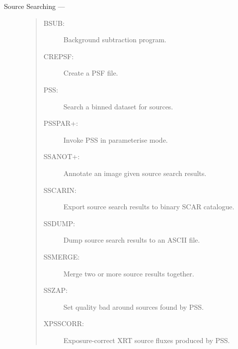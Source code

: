 \begin{description}
\item [Source Searching ---]
\begin{quote}
\begin{description}
\item [BSUB:]      Background subtraction program.
\item [CREPSF:]    Create a PSF file.
\item [PSS:]       Search a binned dataset for sources.
\item [PSSPAR+:]   Invoke PSS in parameterise mode.
\item [SSANOT+:]   Annotate an image given source search results.
\item [SSCARIN:]   Export source search results to binary SCAR catalogue.
\item [SSDUMP:]    Dump source search results to an ASCII file.
\item [SSMERGE:]   Merge two or more source results together.
\item [SSZAP:]     Set quality bad around sources found by PSS.
\item [XPSSCORR:]  Exposure-correct XRT source fluxes produced by PSS.
\end{description}
\end{quote}


\end{description}
